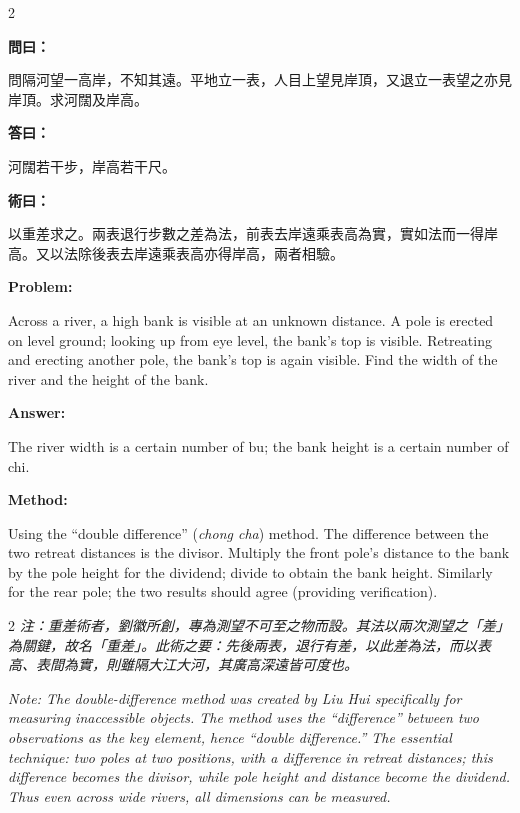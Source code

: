 \documentclass[11pt,a4paper]{article}
\newcommand{\wen}{\textbf{\color{sectioncolor}問}}
\newcommand{\da}{\textbf{\color{answercolor}答}}
\newcommand{\shu}{\textbf{\color{methodcolor}術}}
\newcommand{\prob}{\textbf{\color{sectioncolor}Problem}}
\newcommand{\ans}{\textbf{\color{answercolor}Answer}}
\newcommand{\meth}{\textbf{\color{methodcolor}Method}}
\newenvironment{zhanswer}{%
  \medskip\noindent{\color{answercolor}\rule{0.9\columnwidth}{0.4pt}}%
  \par\color{answercolor}\small
}{\par\medskip}
\newenvironment{enanswer}{%
  \medskip\noindent{\color{answercolor}\rule{0.9\columnwidth}{0.4pt}}%
  \par\color{answercolor}\small
}{\par\medskip}
\newenvironment{zhmethod}{%
  \medskip\noindent{\color{methodcolor}\rule{0.9\columnwidth}{0.4pt}}%
  \par\color{methodcolor}\small
}{\par\medskip}
\newenvironment{enmethod}{%
  \medskip\noindent{\color{methodcolor}\rule{0.9\columnwidth}{0.4pt}}%
  \par\color{methodcolor}\small
}{\par\medskip}
\begin{document}
\begin{paracol}{2}

\switchcolumn[0]
\noindent\wen\textbf{曰：}

問隔河望一高岸，不知其遠。平地立一表，人目上望見岸頂，又退立一表望之亦見岸頂。求河闊及岸高。

\begin{zhanswer}
\noindent\da\textbf{曰：}

河闊若干步，岸高若干尺。
\end{zhanswer}

\begin{zhmethod}
\noindent\shu\textbf{曰：}

以重差求之。兩表退行步數之差為法，前表去岸遠乘表高為實，實如法而一得岸高。又以法除後表去岸遠乘表高亦得岸高，兩者相驗。
\end{zhmethod}

\switchcolumn[1]
\noindent\prob\textbf{:}

Across a river, a high bank is visible at an unknown distance. A pole is erected on level ground; looking up from eye level, the bank's top is visible. Retreating and erecting another pole, the bank's top is again visible. Find the width of the river and the height of the bank.
\begin{enanswer}
\noindent\ans\textbf{:}

The river width is a certain number of bu; the bank height is a certain number of chi.
\end{enanswer}

\begin{enmethod}
\noindent\meth\textbf{:}

Using the ``double difference'' (\textit{chong cha}) method. The difference between the two retreat distances is the divisor. Multiply the front pole's distance to the bank by the pole height for the dividend; divide to obtain the bank height. Similarly for the rear pole; the two results should agree (providing verification).
\end{enmethod}

\end{paracol}

\vspace{0.5em}

\begin{paracol}{2}
\switchcolumn[0]
\noindent\textit{注：重差術者，劉徽所創，專為測望不可至之物而設。其法以兩次測望之「差」為關鍵，故名「重差」。此術之要：先後兩表，退行有差，以此差為法，而以表高、表間為實，則雖隔大江大河，其廣高深遠皆可度也。}

\switchcolumn[1]
\noindent\textit{Note: The double-difference method was created by Liu Hui specifically for measuring inaccessible objects. The method uses the ``difference'' between two observations as the key element, hence ``double difference.'' The essential technique: two poles at two positions, with a difference in retreat distances; this difference becomes the divisor, while pole height and distance become the dividend. Thus even across wide rivers, all dimensions can be measured.}
\end{paracol}
\end{document}
